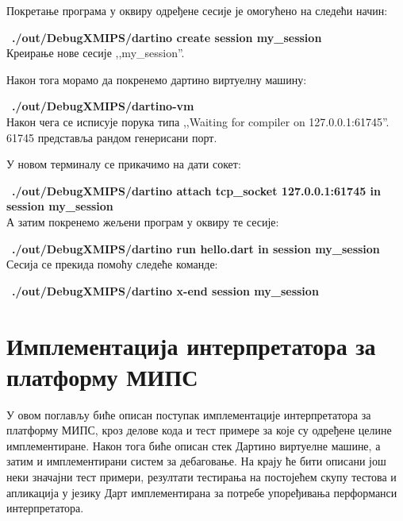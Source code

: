 \documentclass[12pt,oneside]{memoir}
\begin{document}
Покретање програма у оквиру одређене сесије је омогућено на следећи начин: 

~\textbf{./out/DebugXMIPS/dartino create session my\_session}\\
Креирање нове сесије ,,my\_session''.

Након тога морамо да покренемо дартино виртуелну машину:

~\textbf{./out/DebugXMIPS/dartino-vm}\\
Након чега се исписује порука типа ,,Waiting for compiler on 127.0.0.1:61745''. 61745 представља рандом генерисани порт.

У новом терминалу се прикачимо на дати сокет:

~\textbf{./out/DebugXMIPS/dartino attach tcp\_socket 127.0.0.1:61745 in session my\_session}\\

А затим покренемо жељени програм у оквиру те сесије:

~\textbf{./out/DebugXMIPS/dartino run hello.dart in session my\_session}\\

Сесија се прекида помоћу следеће команде:

~\textbf{./out/DebugXMIPS/dartino x-end session my\_session}\\


\chapter{Имплементација интерпретатора за платформу МИПС}
\label{chp:implementacija}
У овом поглављу биће описан поступак имплементације интерпретатора за платформу МИПС, кроз делове кода и тест примере за које су одређене целине имплементиране. Након тога биће описан стек Дартино виртуелне машине, а затим и имплементирани систем за дебаговање. На крају ће бити описани још неки значајни тест примери, резултати тестирања на постојећем скупу тестова и апликација у језику Дарт имплементирана за потребе упоређивања перформанси интерпретатора.
\end{document}
